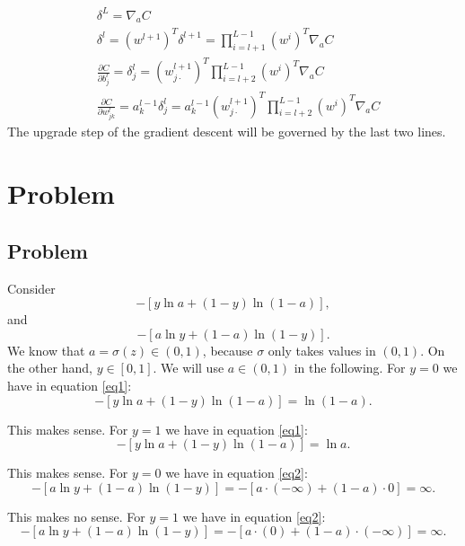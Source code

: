 \documentclass{article}
\begin{document}
\begin{equation}
\begin{aligned}
& \delta^L=\nabla_a C  \\
& \delta^l=\left(w^{l+1}\right)^T \delta^{l+1}=\prod_{i=l+1}^{L-1} \left(w^i\right)^T \nabla_a C\\
& \frac{\partial C}{\partial b_j^l}=\delta_j^l = \left(w^{l+1}_{j\cdot }\right)^T\prod_{i=l+2}^{L-1} \left(w^i\right)^T \nabla_a C\\
& \frac{\partial C}{\partial w_{j k}^l}=a_k^{l-1} \delta_j^l= a_k^{l-1}\left(w^{l+1}_{j\cdot }\right)^T\prod_{i=l+2}^{L-1} \left(w^i\right)^T \nabla_a C
\end{aligned}
\end{equation}
The upgrade step of the gradient descent will be governed by the last two lines.
\section{Problem}
\subsection{Problem}
Consider 
\begin{equation}
\label{eq1}
	-[y \ln a+(1-y) \ln (1-a)],
\end{equation}
and
\begin{equation}
\label{eq2}
	-[a \ln y+(1-a) \ln (1-y)].
\end{equation}
We know that $a=\sigma(z)\in (0,1)$, because $\sigma$ only takes values in $(0,1)$. On the other hand, $y\in [0,1]$. We will use $a\in (0,1)$ in the following.
For $y= 0$ we have in equation \eqref{eq1}:
\begin{equation*}
	-[y \ln a+(1-y) \ln (1-a)]=\ln (1-a).
\end{equation*}

This makes sense. For $y= 1$ we have in equation \eqref{eq1}:
\begin{equation*}
	-[y \ln a+(1-y) \ln (1-a)]=\ln a.
\end{equation*}

This makes sense. For $y= 0$ we have in equation \eqref{eq2}:
\begin{equation*}
	-[a \ln y+(1-a) \ln (1-y)]= -[a \cdot (-\infty) +(1-a) \cdot 0]=\infty.
\end{equation*}

This makes no sense. For $y= 1$ we have in equation \eqref{eq2}:
\begin{equation*}
	-[a \ln y+(1-a) \ln (1-y)]= -[a \cdot (0) +(1-a) \cdot (-\infty)]=\infty.
\end{equation*}
\end{document}
